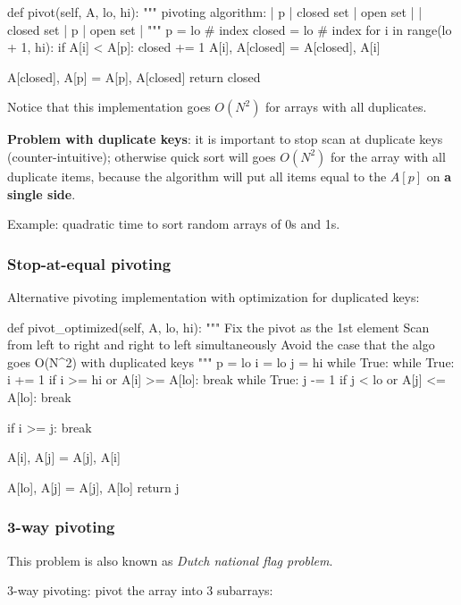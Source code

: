 \begin{python}
def pivot(self, A, lo, hi):
    """
    pivoting algorithm:
    | p | closed set | open set |
    | closed set | p | open set |
    """
    p = lo  # index 
    closed = lo  # index
    for i in range(lo + 1, hi):
        if A[i] < A[p]:
            closed += 1
            A[i], A[closed] = A[closed], A[i]

    A[closed], A[p] = A[p], A[closed]
    return closed
\end{python}

Notice that this implementation goes $O(N^2)$ for arrays with all duplicates.

\textbf{Problem with duplicate keys}: it is important to stop scan at duplicate
keys (counter-intuitive); otherwise quick sort will goes $O(N^2)$ for the
array with all duplicate items, because the algorithm will put all items
equal to the $A[p]$ on \textbf{a single side}. 

Example: quadratic time to sort random arrays of 0s and 1s.

\subsubsection{Stop-at-equal pivoting}
Alternative pivoting implementation with optimization for duplicated keys:
\begin{python}
def pivot_optimized(self, A, lo, hi):
    """
    Fix the pivot as the 1st element
    Scan from left to right and right to left simultaneously
    Avoid the case that the algo goes O(N^2) with duplicated keys
    """
    p = lo
    i = lo
    j = hi
    while True:
        while True:
            i += 1
            if i >= hi or A[i] >= A[lo]:
                break
        while True:
            j -= 1
            if j < lo or A[j] <= A[lo]:
                break

        if i >= j:
            break

        A[i], A[j] = A[j], A[i]

    A[lo], A[j] = A[j], A[lo]
    return j

\end{python}
\subsubsection{3-way pivoting}
This problem is also known as \textit{Dutch national flag problem}.

3-way pivoting: pivot the array into 3 subarrays: 


